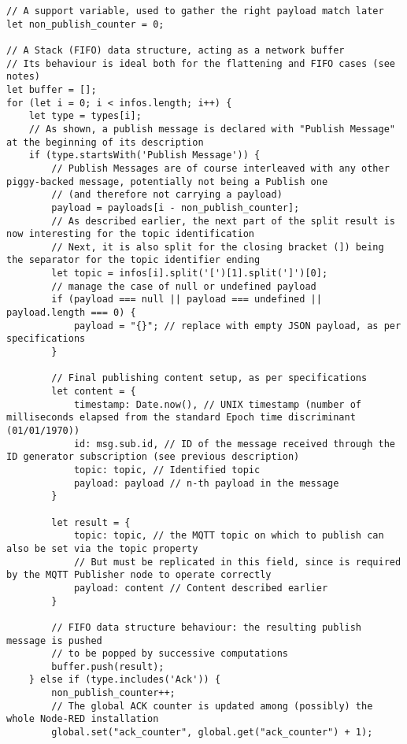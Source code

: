 \documentclass[a4paper,11pt]{article} %
\begin{document}
\begin{verbatim}
// A support variable, used to gather the right payload match later
let non_publish_counter = 0;

// A Stack (FIFO) data structure, acting as a network buffer
// Its behaviour is ideal both for the flattening and FIFO cases (see notes)
let buffer = [];
for (let i = 0; i < infos.length; i++) {
    let type = types[i];
    // As shown, a publish message is declared with "Publish Message" at the beginning of its description
    if (type.startsWith('Publish Message')) {
        // Publish Messages are of course interleaved with any other piggy-backed message, potentially not being a Publish one
        // (and therefore not carrying a payload)
        payload = payloads[i - non_publish_counter];
        // As described earlier, the next part of the split result is now interesting for the topic identification
        // Next, it is also split for the closing bracket (]) being the separator for the topic identifier ending
        let topic = infos[i].split('[')[1].split(']')[0];
        // manage the case of null or undefined payload
        if (payload === null || payload === undefined || payload.length === 0) {
            payload = "{}"; // replace with empty JSON payload, as per specifications
        }

        // Final publishing content setup, as per specifications
        let content = {
            timestamp: Date.now(), // UNIX timestamp (number of milliseconds elapsed from the standard Epoch time discriminant (01/01/1970))
            id: msg.sub.id, // ID of the message received through the ID generator subscription (see previous description)
            topic: topic, // Identified topic
            payload: payload // n-th payload in the message
        }

        let result = {
            topic: topic, // the MQTT topic on which to publish can also be set via the topic property
            // But must be replicated in this field, since is required by the MQTT Publisher node to operate correctly
            payload: content // Content described earlier
        }

        // FIFO data structure behaviour: the resulting publish message is pushed
        // to be popped by successive computations
        buffer.push(result);
    } else if (type.includes('Ack')) {
        non_publish_counter++;
        // The global ACK counter is updated among (possibly) the whole Node-RED installation
        global.set("ack_counter", global.get("ack_counter") + 1);


\end{verbatim}
\end{document}
